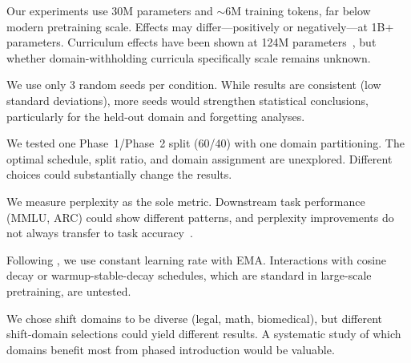  Our experiments use 30M parameters and ${\sim}$6M training tokens, far below modern pretraining scale. Effects may differ---positively or negatively---at 1B+ parameters. Curriculum effects have been shown at 124M parameters~\cite{fan2023irreducible}, but whether domain-withholding curricula specifically scale remains unknown.

 We use only 3 random seeds per condition. While results are consistent (low standard deviations), more seeds would strengthen statistical conclusions, particularly for the held-out domain and forgetting analyses.

 We tested one Phase~1/Phase~2 split (60/40) with one domain partitioning. The optimal schedule, split ratio, and domain assignment are unexplored. Different choices could substantially change the results.

 We measure perplexity as the sole metric. Downstream task performance (\eg MMLU, ARC) could show different patterns, and perplexity improvements do not always transfer to task accuracy~\cite{xie2023doremi}.

 Following \citet{luo2025lrdecay}, we use constant learning rate with EMA. Interactions with cosine decay or warmup-stable-decay schedules, which are standard in large-scale pretraining, are untested.

 We chose shift domains to be diverse (legal, math, biomedical), but different shift-domain selections could yield different results. A systematic study of which domains benefit most from phased introduction would be valuable.
